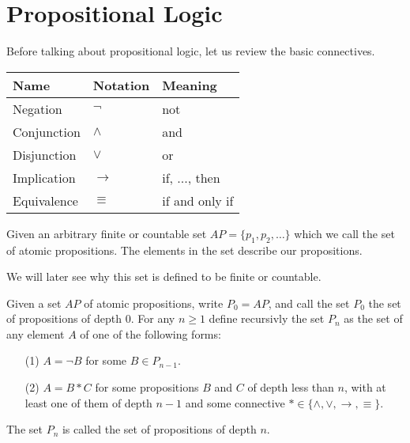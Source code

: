 \documentclass[11pt,a4paper]{article}
\renewcommand{\implies}{\rightarrow}
\begin{document}
	\maketitle
	\newpage
  \section{Propositional Logic}
  Before talking about propositional logic, let us review the basic
  connectives.

  \begin{center}
    \begin{tabular}{|l|l|l|}
      \hline
      Name        & Notation   & Meaning        \\ \hline
      Negation    & $\neg$     & not            \\ \hline
      Conjunction & $\land$    & and            \\ \hline
      Disjunction & $\lor$     & or             \\ \hline
      Implication & $\implies$ & if, ..., then  \\ \hline
      Equivalence & $\equiv$   & if and only if \\ \hline
    \end{tabular}
  \end{center}

  \begin{definition}
    Given an arbitrary finite or countable set $AP = \{p_1,p_2,\dots\}$
    which we call the set of atomic propositions.
    The elements in the set describe our propositions.
  \end{definition}
  
  We will later see why this set is defined to be finite or countable.

  \begin{definition}
    Given a set $AP$ of atomic propositions, write $P_0 = AP$, and call
    the set $P_0$ the set of propositions of depth $0$.
    For any $n \geq 1$ define recursivly the set $P_n$ as the
    set of any element $A$ of one of the following forms:
    \begin{enumerate}
      \item[(1)] $A = \neg B$ for some $B \in P_{n-1}$.
      \item[(2)] $A = B * C$ for some propositions $B$ and $C$ of depth
        less than $n$, with at least one of them of depth $n-1$ and
        some connective $* \in \{\land, \lor, \implies, \equiv\}$.
    \end{enumerate}
    The set $P_n$ is called the set of propositions of depth $n$.
  \end{definition}
\end{document}
